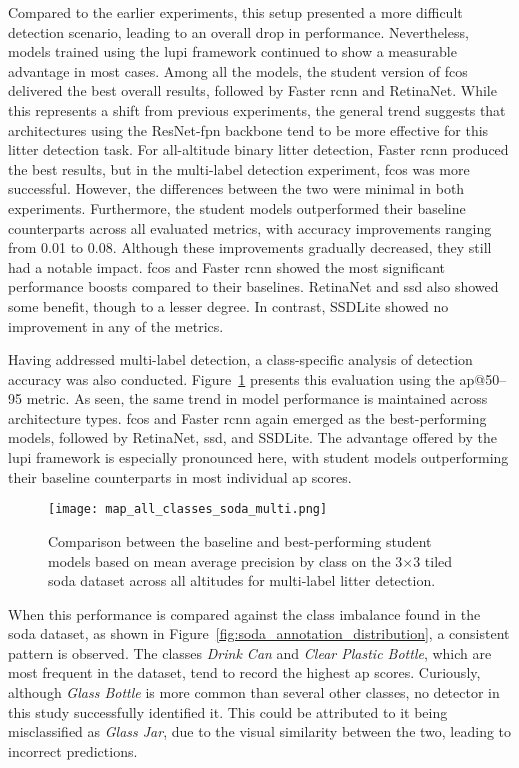 Compared to the earlier experiments, this setup presented a more difficult detection scenario, leading to an overall drop in performance. Nevertheless, models trained using the \gls{lupi} framework continued to show a measurable advantage in most cases.
Among all the models, the student version of \gls{fcos} delivered the best overall results, followed by Faster \gls{rcnn} and RetinaNet. While this represents a shift from previous experiments, the general trend suggests that architectures using the ResNet-\gls{fpn} backbone tend to be more effective for this litter detection task. For all-altitude binary litter detection, Faster \gls{rcnn} produced the best results, but in the multi-label detection experiment, \gls{fcos} was more successful. However, the differences between the two were minimal in both experiments.
Furthermore, the student models outperformed their baseline counterparts across all evaluated metrics, with accuracy improvements ranging from 0.01 to 0.08. Although these improvements gradually decreased, they still had a notable impact. \gls{fcos} and Faster \gls{rcnn} showed the most significant performance boosts compared to their baselines. RetinaNet and \gls{ssd} also showed some benefit, though to a lesser degree. In contrast, SSDLite showed no improvement in any of the metrics.

Having addressed multi-label detection, a class-specific analysis of detection accuracy was also conducted. Figure~\ref{fig:soda_tiled_multi_per_class} presents this evaluation using the \gls{ap}@50--95 metric. As seen, the same trend in model performance is maintained across architecture types. \gls{fcos} and Faster \gls{rcnn} again emerged as the best-performing models, followed by RetinaNet, \gls{ssd}, and SSDLite. The advantage offered by the \gls{lupi} framework is especially pronounced here, with student models outperforming their baseline counterparts in most individual \gls{ap} scores.

\begin{figure}[!ht]
    \centering
    \texttt{[image: map\_all\_classes\_soda\_multi.png]}
    \caption{Comparison between the baseline and best-performing student models based on mean average precision by class on the 3$\times$3 tiled \gls{soda} dataset across all altitudes for multi-label litter detection.}
    \label{fig:soda_tiled_multi_per_class}
\end{figure}

When this performance is compared against the class imbalance found in the \gls{soda} dataset, as shown in Figure~\ref{fig:soda_annotation_distribution}, a consistent pattern is observed. The classes \textit{Drink Can} and \textit{Clear Plastic Bottle}, which are most frequent in the dataset, tend to record the highest \gls{ap} scores. Curiously, although \textit{Glass Bottle} is more common than several other classes, no detector in this study successfully identified it. This could be attributed to it being misclassified as \textit{Glass Jar}, due to the visual similarity between the two, leading to incorrect predictions.

